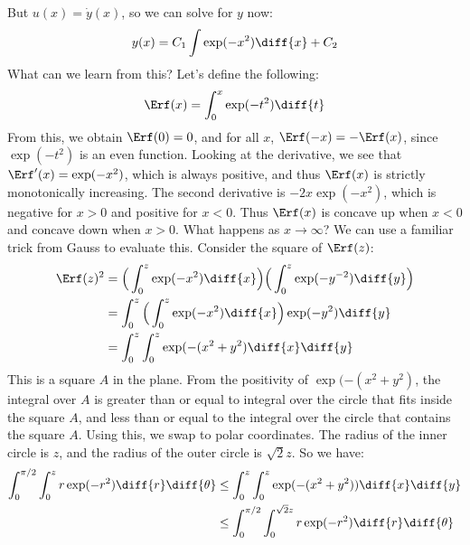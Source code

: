         But $u(x)=\dot{y}(x)$, so we can solve for $y$ now:
        \begin{equation}
            y(x)=C_{1}\int\exp(-x^{2})\diff{x}+C_{2}
        \end{equation}
        What can we learn from this? Let's define the following:
        \begin{equation}
            \Erf(x)=\int_{0}^{x}\exp(-t^{2})\diff{t}
        \end{equation}
        From this, we obtain $\Erf(0)=0$, and for all
        $x$, $\Erf(-x)=-\Erf(x)$, since $\exp(-t^{2})$ is an
        even function. Looking at the derivative, we see that
        $\Erf'(x)=\exp(-x^{2})$, which is always positive, and
        thus $\Erf(x)$ is strictly monotonically increasing.
        The second derivative is $-2x\exp(-x^{2})$, which is
        negative for $x>0$ and positive for $x<0$. Thus $\Erf(x)$
        is concave up when $x<0$ and concave down when $x>0$.
        What happens as $x\rightarrow\infty$? We can use a
        familiar trick from Gauss to evaluate this. Consider
        the square of $\Erf(z)$:
        \begin{align}
            \Erf(z)^{2}
            &=\Big(\int_{0}^{z}\exp(-x^{2})\diff{x}\Big)
            \Big(\int_{0}^{z}\exp(-y^{-2})\diff{y}\Big)\\
            &=\int_{0}^{z}
                \Big(\int_{0}^{z}\exp(-x^{2})\diff{x}\Big)
                \exp(-y^{2})\diff{y}\\
            &=\int_{0}^{z}\int_{0}^{z}\exp(-(x^{2}+y^{2})
                \diff{x}\diff{y}
        \end{align}
        This is a square $A$ in the plane. From the positivity of
        $\exp(-(x^{2}+y^{2})$, the integral over $A$ is greater
        than or equal to integral over the circle that fits
        inside the square $A$, and less than or equal to the
        integral over the circle that contains the square $A$.
        Using this, we swap to polar coordinates. The radius
        of the inner circle is $z$, and the radius of the
        outer circle is $\sqrt{2}z$. So we have:
        \begin{align}
            \int_{0}^{\pi/2}\int_{0}^{z}r\exp(-r^{2})
                \diff{r}\diff{\theta}
            &\leq\int_{0}^{z}\int_{0}^{z}\exp(-(x^{2}+y^{2}))
                \diff{x}\diff{y}\\
            &\leq\int_{0}^{\pi/2}\int_{0}^{\sqrt{2}z}r\exp(-r^{2})
                \diff{r}\diff{\theta}
        \end{align}
